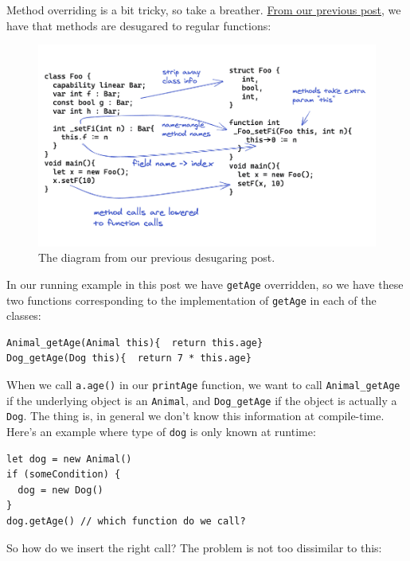 Method overriding is a bit tricky, so take a breather.
\href{http://mukulrathi.co.uk/create-your-own-programming-language/lower-language-constructs-to-llvm/\#lowering-objects-to-structs}{From
our previous post}, we have that methods are desugared to regular
functions:

\begin{figure}
\centering
\includegraphics[width=\linewidth]{11_files/lower-classes.png}
\caption{The diagram from our previous desugaring post.}
\end{figure}

In our running example in this post we have \texttt{getAge} overridden,
so we have these two functions corresponding to the implementation of
\texttt{getAge} in each of the classes:


\begin{verbatim}
Animal_getAge(Animal this){  return this.age}
Dog_getAge(Dog this){  return 7 * this.age}
\end{verbatim}

When we call \texttt{a.age()} in our \texttt{printAge} function, we want
to call \texttt{Animal\_getAge} if the underlying object is an
\texttt{Animal}, and \texttt{Dog\_getAge} if the object is actually a
\texttt{Dog}. The thing is, in general we don't know this information at
compile-time. Here's an example where type of \texttt{dog} is only known
at runtime:


\begin{verbatim}
let dog = new Animal()
if (someCondition) {
  dog = new Dog()
}
dog.getAge() // which function do we call?
\end{verbatim}

So how do we insert the right call? The problem is not too dissimilar to
this:

